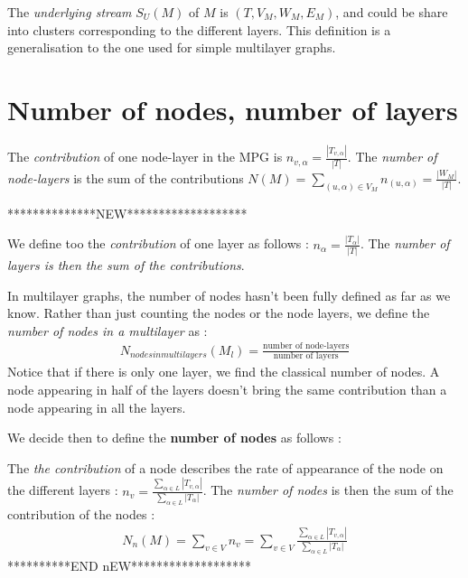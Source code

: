\documentclass[dvipsnames,a4paper,11pt]{article}
\theoremstyle{definition}
\theoremstyle{remark}
\theoremstyle{remark}
\begin{document}
    The {\em underlying stream } $S_U(M)$ of $M$ is $(T,V_M,W_M,E_M)$, and could be share into clusters corresponding to the different layers. This definition is a generalisation to the one used for simple multilayer graphs.




   

	


	\section{Number of nodes, number of layers}
	
	
	 The {\em contribution} of one node-layer in the MPG is $n_{v,\alpha} = \frac{|T_{v,\alpha}|}{|T|}$. The {\em number of node-layers} is the sum of the contributions $N(M) = \underset{(u,\alpha)\in V_M}{\sum} n_{(u,\alpha)} = \frac{|W_M|}{|T|}$.
    
**************NEW*******************    
    
    We define too the {\em contribution} of one layer as follows : $n_\alpha = \frac{|T_{\alpha}|}{|T|}$. The {\em number of layers is then the sum of the contributions}.
    
	In multilayer graphs, the number of nodes hasn't been fully defined as far as we know.
	Rather than just counting the nodes or the node layers, we define the {\em number of nodes in a multilayer} as :
	\begin{align*}
		N_{nodes in multilayers}(M_l) = \frac{\text{number of node-layers}}{\text{number of layers}}
	\end{align*}	    
	Notice that if there is only one layer, we find the classical number of nodes. A node appearing in half of the layers doesn't bring the same contribution than a node appearing in all the layers.  
    
    We decide then to define the \textbf{number of nodes} as follows : 
    
    The {\em the contribution} of a node describes the rate of appearance of the node on the different layers : $n_v = \frac{\sum_{\alpha \in L}|T_{v,\alpha}|}{\sum_{\alpha \in L} |T_{\alpha}|}$.
    The {\em number of nodes} is then the sum of the contribution of the nodes : 
    \begin{align}
    N_n(M) = \sum_{v\in V} n_v= \sum_{v\in V} \frac{\sum_{\alpha \in L}|T_{v,\alpha}|}{\sum_{\alpha \in L} |T_{\alpha}|} 
    \label{numberNodes}
	\end{align}     
**********END nEW*******************
\end{document}
